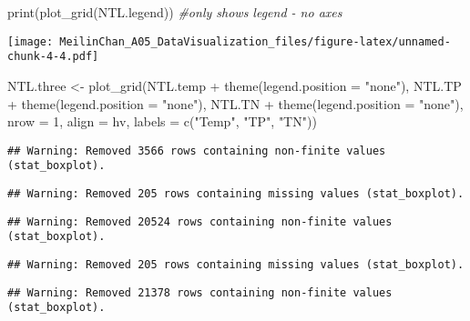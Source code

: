 \documentclass[
]{article}
\newenvironment{Shaded}{\begin{snugshade}}{\end{snugshade}}
\newcommand{\AttributeTok}[1]{\textcolor[rgb]{0.77,0.63,0.00}{#1}}
\newcommand{\CommentTok}[1]{\textcolor[rgb]{0.56,0.35,0.01}{\textit{#1}}}
\newcommand{\DecValTok}[1]{\textcolor[rgb]{0.00,0.00,0.81}{#1}}
\newcommand{\FunctionTok}[1]{\textcolor[rgb]{0.00,0.00,0.00}{#1}}
\newcommand{\NormalTok}[1]{#1}
\newcommand{\OtherTok}[1]{\textcolor[rgb]{0.56,0.35,0.01}{#1}}
\newcommand{\SpecialCharTok}[1]{\textcolor[rgb]{0.00,0.00,0.00}{#1}}
\newcommand{\StringTok}[1]{\textcolor[rgb]{0.31,0.60,0.02}{#1}}
\begin{document}
\begin{Shaded}
\begin{Highlighting}[]
\FunctionTok{print}\NormalTok{(}\FunctionTok{plot\_grid}\NormalTok{(NTL.legend)) }\CommentTok{\#only shows legend {-} no axes}
\end{Highlighting}
\end{Shaded}

\texttt{[image: MeilinChan\_A05\_DataVisualization\_files/figure-latex/unnamed-chunk-4-4.pdf]}

\begin{Shaded}
\begin{Highlighting}[]
\NormalTok{NTL.three }\OtherTok{\textless{}{-}} \FunctionTok{plot\_grid}\NormalTok{(NTL.temp }\SpecialCharTok{+} \FunctionTok{theme}\NormalTok{(}\AttributeTok{legend.position =} \StringTok{"none"}\NormalTok{),}
\NormalTok{                       NTL.TP }\SpecialCharTok{+} \FunctionTok{theme}\NormalTok{(}\AttributeTok{legend.position =} \StringTok{"none"}\NormalTok{),}
\NormalTok{                       NTL.TN }\SpecialCharTok{+} \FunctionTok{theme}\NormalTok{(}\AttributeTok{legend.position =} \StringTok{"none"}\NormalTok{),}
                       \AttributeTok{nrow =} \DecValTok{1}\NormalTok{, }
                       \AttributeTok{align =} \StringTok{\textquotesingle{}hv\textquotesingle{}}\NormalTok{,}
                       \AttributeTok{labels =} \FunctionTok{c}\NormalTok{(}\StringTok{"Temp"}\NormalTok{, }\StringTok{"TP"}\NormalTok{, }\StringTok{"TN"}\NormalTok{))}
\end{Highlighting}
\end{Shaded}

\begin{verbatim}
## Warning: Removed 3566 rows containing non-finite values (stat_boxplot).
\end{verbatim}

\begin{verbatim}
## Warning: Removed 205 rows containing missing values (stat_boxplot).
\end{verbatim}

\begin{verbatim}
## Warning: Removed 20524 rows containing non-finite values (stat_boxplot).
\end{verbatim}

\begin{verbatim}
## Warning: Removed 205 rows containing missing values (stat_boxplot).
\end{verbatim}

\begin{verbatim}
## Warning: Removed 21378 rows containing non-finite values (stat_boxplot).
\end{verbatim}
\end{document}

